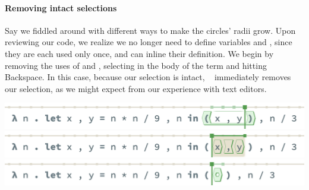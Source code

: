 \paragraph{Removing intact selections}
Say we fiddled around with different ways to make
the circles' radii grow.
Upon reviewing our code, we realize we no longer
need to define variables  and ,
since they are each used only once, and can inline
their definition.
We begin by removing the uses of  and ,
selecting  in the body of the 
term and hitting Backspace.
In this case, because our selection is intact, \tylr~
immediately removes our selection, as we might
expect from our experience with text editors.
\begin{center}
  \includegraphics[width=\columnwidth]{img/remove-intact-0.png}
  \includegraphics[width=\columnwidth]{img/remove-intact-1.png}
  \includegraphics[width=\columnwidth]{img/remove-intact-2.png}
\end{center}

